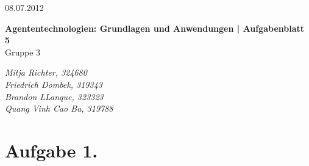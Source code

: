 \documentclass[a4paper]{article}
\begin{document}
  \begin{flushright}
    08.07.2012
  \end{flushright}
  \begin{center}
    \Large\textbf{{Agententechnologien: Grundlagen und Anwendungen | Aufgabenblatt 5}}\\
    \Large Gruppe 3
  \end{center}

  \begin{center}
        \large\textsl{Mitja Richter, 324680}\\
        \large\textsl{Friedrich Dombek, 319343}\\
        \large\textsl{Brandon LLanque, 323323}\\
        \large\textsl{Quang Vinh Cao Ba, 319788}\\
  \end{center}

\section*{Aufgabe 1.}
\end{document}
